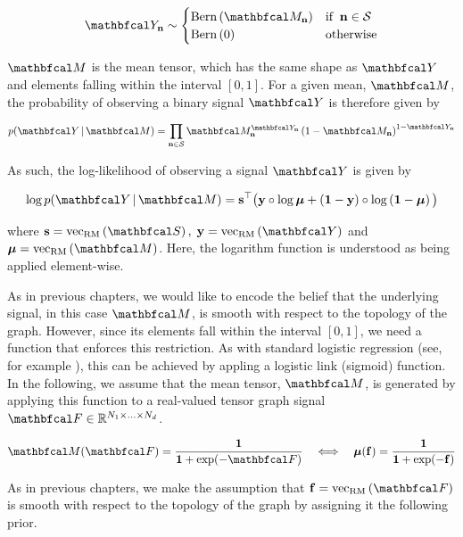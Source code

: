 \begin{equation}
    \Yt_\nn \sim  \begin{cases}
        \text{Bern}\left(\Mt_\nn \right) & \text{if} \;\; \nn \in \mathcal{S} \\
        \text{Bern}\left(0\right) & \text{otherwise}
    \end{cases}
\end{equation}


$\Mt$ is the mean tensor, which has the same shape as $\Yt$ and elements falling within the interval $[0, 1]$. For a given mean, $\Mt$, the probability of observing a binary signal $\Yt$ is therefore given by 

\begin{equation}
    p(\Yt \, | \, \Mt) = \prod_{\nn \in \mathcal{S}} \Mt_\nn^{\Yt_\nn}\left(1 - \Mt_\nn\right)^{1 - \Yt_\nn}
\end{equation}

As such, the log-likelihood of observing a signal $\Yt$ is given by 

\begin{equation}
   \log p(\Yt \, | \, \Mt) = \s^\top \big(\y \circ \log \muu + \left(\one  - \y\right) \circ \log \left(\one - \muu \right)\big)
\end{equation}

where $\s = \vecrm{\St}, \; \y = \vecrm{\Yt}$ and $\muu = \vecrm{\Mt}$. Here, the logarithm function is understood as being applied element-wise.

As in previous chapters, we would like to encode the belief that the underlying signal, in this case $\Mt$, is smooth with respect to the topology of the graph. However, since its elements fall within the interval $[0, 1]$, we need a function that enforces this restriction. As with standard logistic regression (see, for example \cite{Murphy2012}), this can be achieved by appling a logistic link (sigmoid) function. In the following, we assume that the mean tensor, $\Mt$, is generated by applying this function to a real-valued tensor graph signal $\Ft \in \R^{N_1 \times ... \times N_d}$. 

\begin{equation}
    \label{eq:logistic_link}
    \Mt(\Ft) = \frac{\one}{\one + \exp(-\Ft)} \quad \Longleftrightarrow \quad \muu(\f) = \frac{\one}{\one + \exp(-\f)}
\end{equation}

As in previous chapters, we make the assumption that $\f = \vecrm{\Ft}$ is smooth with respect to the topology of the graph by assigning it the following prior. 

